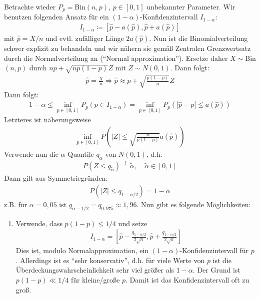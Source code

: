 \documentclass[a4paper]{scrartcl}
\begin{document}
		\begin{example}
			Betrachte wieder $P_p=$Bin$(n,p)$, $p\in[0,1]$ unbekannter Parameter. Wir benutzen folgenden Ansatz für ein $(1-\alpha)$-Konfidenzintervall $I_{1-\alpha}$:
			\begin{align*}
				I_{1-\alpha}\coloneq \left[\hat{p}-a(\hat{p}),\hat{p}+a(\hat{p})\right]
			\end{align*}
			mit $\hat{p}=X/n$ und evtl. zufälliger Länge $2a(\hat{p})$. Nun ist die Binomialverteilung schwer explizit zu behandeln und wir nähern sie gemäß Zentralen Grenzwertsatz durch die Normalverteilung an ("`Normal approximation"'). Ersetze daher $X\sim$Bin$(n,p)$ durch $np+\sqrt{np(1-p)}Z$ mit $Z\sim N(0,1)$. Dann folgt:
			\begin{align*}
				\hat{p}=\frac{X}{n}\Rightarrow \hat{p}\approx p+\sqrt{\frac{p(1-p)}{n}}Z
			\end{align*}
			Dann folgt:
			\begin{align*}
				1-\alpha\le \inf_{p\in[0,1]}P_p\left(p\in I_{1-\alpha}\right)=\inf_{p\in[0,1]}P_p\left(|\hat{p}-p|\le a(\hat{p})\right)
			\end{align*}
			Letzteres ist näherungsweise
			\begin{align*}
				\inf_{p\in[0,1]}P\left(|Z|\le \sqrt{\frac{n}{p(1-p)}}a(\hat{p})\right)
			\end{align*}
			Verwende nun die $\tilde{\alpha}$-Quantile $q_{\tilde{\alpha}}$ von $N(0,1)$, d.h.
			\begin{align*}
				P(Z\le q_{\tilde{\alpha}})\overset{!}{=}\tilde{\alpha},\quad\tilde{\alpha}\in[0,1]
			\end{align*}
			Dann gilt aus Symmetriegründen:
			\begin{align*}
				P\left(|Z|\le q_{1-\alpha/2}\right)=1-\alpha
			\end{align*}
			z.B. für $\alpha=0,05$ ist $q_{\alpha-1/2}=q_{0,975}\approx 1,96$. Nun gibt es folgende Möglichkeiten:
			\begin{enumerate}[1)]
				\item Verwende, dass $p(1-p)\le 1/4$ und setze
				\begin{align*}
					I_{1-\alpha}=\left[\hat{p}-\frac{q_{1-\alpha/2}}{2\sqrt{n}},\hat{p}+\frac{q_{1-\alpha/2}}{2\sqrt{n}}\right]
				\end{align*}
				Dies ist, modulo Normalapproximation, ein $(1-\alpha)$-Konfidenzintervall für $p$. Allerdings ist es "`sehr konservativ"', d.h. für viele Werte  von $p$ ist die Überdeckungswahrscheinlichkeit sehr viel größer als $1-\alpha$. Der Grund ist $p(1-p)\ll 1/4$ für kleine/große $p$. Damit ist das Konfidenzintervall oft zu groß.

\end{enumerate}
\end{example}
\end{document}

